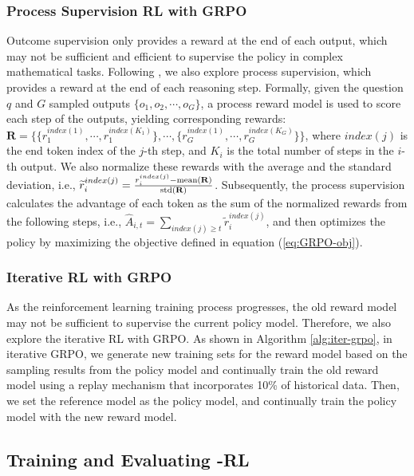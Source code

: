 \subsubsection{Process Supervision RL with GRPO} 
Outcome supervision only provides a reward at the end of each output, which may not be sufficient and efficient to supervise the policy in complex mathematical tasks. Following \cite{wang2023math}, we also explore process supervision, which provides a reward at the end of each reasoning step. Formally, given the question $q$ and $G$  sampled outputs $\{o_1, o_2, \cdots, o_G\}$, a process reward model is used to score each step of the outputs, yielding corresponding rewards: $\mathbf{R} = \{ \{r_1^{index(1)},\cdots,r_1^{index(K_1)}\}, \cdots,  \{r_G^{index(1)},\cdots,r_G^{index(K_G)}\} \}$, where $index(j)$ is the end token index of the $j$-th step, and $K_i$ is the total number of steps in the $i$-th output. We also normalize these rewards with the average and the standard deviation, i.e., $\widetilde{r}_i^{index(j)} = \frac{r_i^{index(j)} - {\rm mean(\mathbf{R})}}{{\rm std(\mathbf{R})}}$.
Subsequently, the process supervision calculates the advantage of each token as the sum of the normalized rewards from the following steps, i.e., $\hat{A}_{i, t} = \sum_{index(j) \ge t} \widetilde{r}_i^{index(j)}$,
and then optimizes the policy by maximizing the objective defined in equation (\ref{eq:GRPO-obj}).






\subsubsection{Iterative RL with GRPO}
As the reinforcement learning training process progresses, the old reward model may not be sufficient to supervise the current policy model.
Therefore, we also explore the iterative RL with GRPO.
As shown in Algorithm \ref{alg:iter-grpo}, in iterative GRPO, we generate new training sets for the reward model based on the sampling results from the policy model and continually train the old reward model using a replay mechanism that incorporates 10\% of historical data.
Then, we set the reference model as the policy model, and continually train the policy model with the new reward model.

\subsection{Training and Evaluating \spmath-RL}

